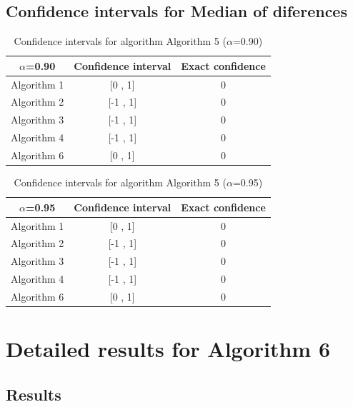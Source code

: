 \documentclass[a4paper,10pt]{article}
\begin{document}
\subsection{Confidence intervals for Median of diferences}

\begin{table}[!htp]
\centering\small
\begin{tabular}{
|c|c|c|}
\hline
 $\alpha$=0.90 & Confidence interval & Exact confidence \\ \hline 
Algorithm 1 & [0 , 1] & 0\\ \hline 
Algorithm 2 & [-1 , 1] & 0\\ \hline 
Algorithm 3 & [-1 , 1] & 0\\ \hline 
Algorithm 4 & [-1 , 1] & 0\\ \hline 
Algorithm 6 & [0 , 1] & 0\\ \hline 

\end{tabular}
\caption{Confidence intervals for algorithm Algorithm 5 ($\alpha$=0.90)}
\end{table}
\begin{table}[!htp]
\centering\small
\begin{tabular}{
|c|c|c|}
\hline
 $\alpha$=0.95 & Confidence interval & Exact confidence \\ \hline 
Algorithm 1 & [0 , 1] & 0\\ \hline 
Algorithm 2 & [-1 , 1] & 0\\ \hline 
Algorithm 3 & [-1 , 1] & 0\\ \hline 
Algorithm 4 & [-1 , 1] & 0\\ \hline 
Algorithm 6 & [0 , 1] & 0\\ \hline 

\end{tabular}
\caption{Confidence intervals for algorithm Algorithm 5 ($\alpha$=0.95)}
\end{table}

 \clearpage 


\section{Detailed results for Algorithm 6}


\subsection{Results}
\end{document}
